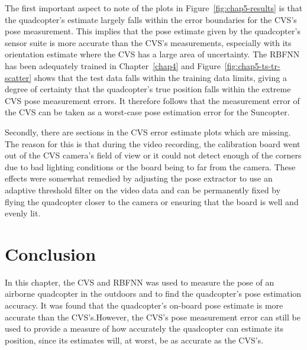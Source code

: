 The first important aspect to note of the plots in Figure~\ref{fig:chap5-results} is that the quadcopter's estimate largely falls within the error boundaries for the CVS's pose measurement. This implies that the pose estimate given by the quadcopter's sensor suite is more accurate than the CVS's measurements, especially with its orientation estimate where the CVS has a large area of uncertainty. The RBFNN has been adequately trained in Chapter~\ref{chap4} and Figure~\ref{fig:chap5-ts-tr-scatter} shows that the test data falls within the training data limits, giving a degree of certainty that the quadcopter's true position falls within the extreme CVS pose measurement errors. It therefore follows that the measurement error of the CVS can be taken as a worst-case pose estimation error for the Suncopter. 

Secondly, there are sections in the CVS error estimate plots which are missing. The reason for this is that during the video recording, the calibration board went out of the CVS camera's field of view or it could not detect enough of the corners due to bad lighting conditions or the board being to far from the camera. These effects were somewhat remedied by adjusting the pose extractor to use an adaptive threshold filter on the video data and can be permanently fixed by flying the quadcopter closer to the camera or ensuring that the board is well and evenly lit. 

\section{Conclusion}

In this chapter, the CVS and RBFNN was used to measure the pose of an airborne quadcopter in the outdoors and to find the quadcopter's pose estimation accuracy. It was found that the quadcopter's on-board pose estimate is more accurate than the CVS's.\@ However, the CVS's pose measurement error can still be used to provide a measure of how accurately the quadcopter can estimate its position, since its estimates will, at worst, be as accurate as the CVS's.\@ 
